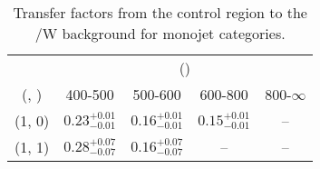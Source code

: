 \begin{table}[h!]
\tiny
\centering
\caption{Transfer factors from the \gj control region to the \ttbar/W background for monojet categories.\label{tab:tf_gj_ttw_mono}}
\begin{tabular}
{ccccc}
	\hline\hline
	& \multicolumn{4}{c}{\scalht (\gev)} \\ 
	 (\njet,  \nb) & 400-500 & 500-600 & 600-800 & 800-$\infty$ \\ [0.8ex] 
\hline
	(1, 0) & $0.23^{+ 0.01 }_{- 0.01 }$ & $0.16^{+ 0.01 }_{- 0.01 }$ & $0.15^{+ 0.01 }_{- 0.01 }$ & -- \\[0.5ex] 
	(1, 1) & $0.28^{+ 0.07 }_{- 0.07 }$ & $0.16^{+ 0.07 }_{- 0.07 }$ & -- & -- \\[0.5ex] 
	\hline
	\hline
\end{tabular}
\end{table}
